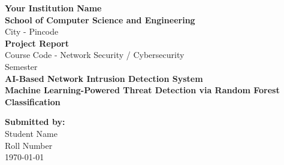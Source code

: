 \documentclass[12pt,a4paper]{article}
\begin{document}
\begin{titlepage}
    \centering
    \vspace*{2cm}
    
    {\Large \textbf{Your Institution Name}}\\[0.5cm]
    {\Large \textbf{School of Computer Science and Engineering}}\\[0.5cm]
    {\large City - Pincode}\\[2cm]
    
    {\LARGE \textbf{Project Report}}\\[0.5cm]
    {\large Course Code - Network Security / Cybersecurity}\\[0.5cm]
    {\large Semester}\\[3cm]
    
    {\huge \textbf{AI-Based Network Intrusion Detection System}}\\[0.5cm]
    {\Large \textbf{Machine Learning-Powered Threat Detection via Random Forest Classification}}\\[3cm]
    
    \vfill
    
    {\large \textbf{Submitted by:}}\\[0.3cm]
    {\large Student Name}\\
    {\large Roll Number}\\[1cm]
    
    {\large \today}
\end{titlepage}

\newpage
\tableofcontents
\newpage

\begin{abstract}
Network security has become paramount in the digital age, with cyber threats evolving in sophistication and frequency. Traditional signature-based Intrusion Detection Systems (IDS) struggle to detect novel attack patterns and zero-day exploits. This project presents an AI-Based Network Intrusion Detection System (AI-NIDS) that leverages Machine Learning, specifically Random Forest classification, to detect malicious network traffic with high accuracy. The system processes network flow statistics from the CIC-IDS dataset, trains a Random Forest classifier with 200 decision trees, and provides real-time threat detection with 99.99\% accuracy. Additionally, the system integrates Explainable AI via Groq's LLaMA 3.3 model to provide human-readable security analysis, mimicking a Security Operations Center (SOC) analyst. The web-based interface, built with Streamlit, enables security professionals to upload datasets, train models, simulate packet capture, and receive detailed threat assessments with feature importance visualization. This educational implementation demonstrates the practical application of AI in cybersecurity while maintaining accessibility for learning and research purposes.

\textbf{Keywords:} Intrusion Detection System, Machine Learning, Random Forest, Network Security, Explainable AI, CIC-IDS Dataset, Threat Detection
\end{abstract}
\end{document}
